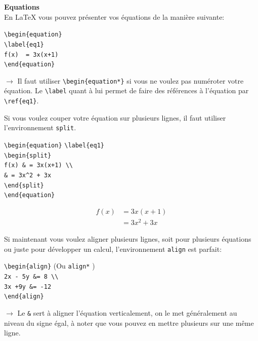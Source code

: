 \documentclass[11pt]{article}				%
\newcommand{\cmd}[2]{\texttt{\textbackslash #1}\texttt{\{#2\}}}
\begin{document}
\textbf{Equations}\\

En LaTeX vous pouvez présenter vos équations de la manière suivante:

\begin{multicols}{2}

\cmd{begin}{equation} \\
\cmd{label}{eq1} \\
\verb|f(x)  = 3x(x+1) | \\
\cmd{end}{equation} 

\columnbreak

$\rightarrow$ Il faut utiliser \cmd{begin}{equation*} si vous ne voulez pas numéroter votre équation. Le \verb|\label| quant à lui permet de faire des références à l'équation par \verb|\ref{eq1}|.

\end{multicols}
Si vous voulez couper votre équation sur plusieurs lignes, il faut utiliser l'environnement \verb|split|.
\begin{multicols}{2}
\cmd{begin}{equation} \cmd{label}{eq1} \\
\cmd{begin}{split} \\
\verb|f(x) & = 3x(x+1) \\ | \\
\verb|& = 3x^2 + 3x | \\
\cmd{end}{split} \\
\cmd{end}{equation} 

\columnbreak

\begin{equation} \label{eq1}
\begin{split}
f(x) & = 3x(x+1) \\
& = 3x^2 +3x
\end{split}
\end{equation}
	
\end{multicols}

Si maintenant vous voulez aligner plusieurs lignes, soit pour plusieurs équations ou juste pour développer un calcul, l'environnement \verb|align| est parfait:

\begin{multicols}{2}

\cmd{begin}{align} \quad (Ou \verb|align*| )\\
\verb|2x - 5y &= 8 \\| \\
\verb|3x +9y &= -12| \\
\cmd{end}{align} \\

\columnbreak

$\rightarrow$ Le \verb|&| sert à aligner l'équation verticalement, on le met généralement au niveau du signe égal, à noter que vous pouvez en mettre plusieurs sur une même ligne.

\end{multicols} 
\end{document}
